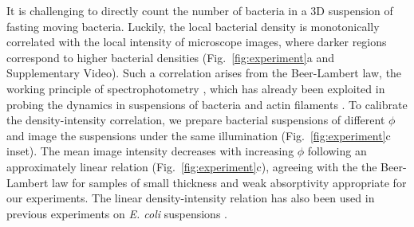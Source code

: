 \documentclass[twocolumn,aps,prl,amsmath,amssymb,longbibliography]{revtex4-2}
\begin{document}
It is challenging to directly count the number of bacteria in a 3D suspension of fasting moving bacteria. Luckily, the local bacterial density is monotonically correlated with the local intensity of microscope images, where darker regions correspond to higher bacterial densities (Fig.~\ref{fig:experiment}a and Supplementary Video). Such a correlation arises from the Beer-Lambert law, the working principle of spectrophotometry \cite{Tortora2018}, which has already been exploited in probing the dynamics in suspensions of bacteria and actin filaments \cite{Sokolov2009, Wilson2011, Schaller2013}.
To calibrate the density-intensity correlation, we prepare bacterial suspensions of different $\phi$ and image the suspensions under the same illumination (Fig.~\ref{fig:experiment}c inset). The mean image intensity decreases with increasing $\phi$ following an approximately linear relation (Fig.~\ref{fig:experiment}c), agreeing with the the Beer-Lambert law for samples of small thickness and weak absorptivity appropriate for our experiments. The linear density-intensity relation has also been used in previous experiments on \textit{E. coli} suspensions \cite{Wilson2011}.

\end{document}
